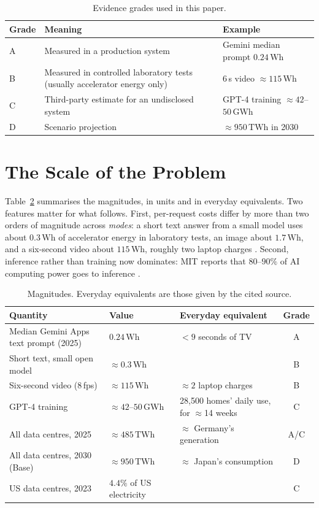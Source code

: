 \documentclass[11pt]{article}
\theoremstyle{definition}
\theoremstyle{remark}
\newcommand{\Wh}{\,\mathrm{Wh}}
\newcommand{\TWh}{\,\mathrm{TWh}}
\begin{document}
\begin{table}[h]
\centering
\caption{Evidence grades used in this paper.}
\label{tab:grades}
\begin{tabularx}{\textwidth}{@{}lXl@{}}
\toprule
Grade & Meaning & Example \\
\midrule
A & Measured in a production system & Gemini median prompt $0.24\Wh$ \citep{elsworth2025} \\
B & Measured in controlled laboratory tests (usually accelerator energy only) & 6\,s video $\approx 115\Wh$ \citep{iea2025} \\
C & Third-party estimate for an undisclosed system & GPT-4 training $\approx 42$--$50$\,GWh \citep{iea2025,mittr2025} \\
D & Scenario projection & $\approx 950\TWh$ in 2030 \citep{iea2026} \\
\bottomrule
\end{tabularx}
\end{table}

\section{The Scale of the Problem}\label{sec:scale}

Table~\ref{tab:scale} summarises the magnitudes, in units and in everyday equivalents. Two features matter for what follows. First, per-request costs differ by more than two orders of magnitude across \emph{modes}: a short text answer from a small model uses about $0.3\Wh$ of accelerator energy in laboratory tests, an image about $1.7\Wh$, and a six-second video about $115\Wh$, roughly two laptop charges \citep{iea2025}. Second, inference rather than training now dominates: MIT reports that $80$--$90\%$ of AI computing power goes to inference \citep{mittr2025}.

\begin{table}[h]
\centering
\caption{Magnitudes. Everyday equivalents are those given by the cited source.}
\label{tab:scale}
\begin{tabularx}{\textwidth}{@{}Xllc@{}}
\toprule
Quantity & Value & Everyday equivalent & Grade \\
\midrule
Median Gemini Apps text prompt (2025) & $0.24\Wh$ & $<9$ seconds of TV & A \\
Short text, small open model & $\approx 0.3\Wh$ & & B \\
Six-second video (8\,fps) & $\approx 115\Wh$ & $\approx 2$ laptop charges & B \\
GPT-4 training & $\approx 42$--$50$\,GWh & 28,500 homes' daily use, for $\approx$14 weeks & C \\
All data centres, 2025 & $\approx 485\TWh$ & $\approx$ Germany's generation & A/C \\
All data centres, 2030 (Base) & $\approx 950\TWh$ & $\approx$ Japan's consumption & D \\
US data centres, 2023 & $4.4\%$ of US electricity & & C \\
\bottomrule
\end{tabularx}
\end{table}
\end{document}
